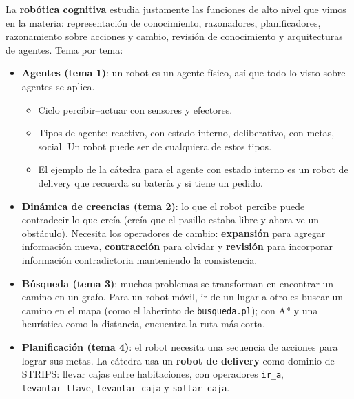 \documentclass[11pt,a4paper]{article}
\begin{document}
La \textbf{robótica cognitiva} estudia justamente las funciones de alto nivel que vimos en la materia: representación de conocimiento, razonadores, planificadores, razonamiento sobre acciones y cambio, revisión de conocimiento y arquitecturas de agentes. Tema por tema:
\begin{itemize}
  \item \textbf{Agentes (tema 1)}: un robot es un agente físico, así que todo lo visto sobre agentes se aplica.
  \begin{itemize}
    \item Ciclo percibir--actuar con sensores y efectores.
    \item Tipos de agente: reactivo, con estado interno, deliberativo, con metas, social. Un robot puede ser de cualquiera de estos tipos.
    \item El ejemplo de la cátedra para el agente con estado interno es un robot de delivery que recuerda su batería y si tiene un pedido.
  \end{itemize}
  \item \textbf{Dinámica de creencias (tema 2)}: lo que el robot percibe puede contradecir lo que creía (creía que el pasillo estaba libre y ahora ve un obstáculo). Necesita los operadores de cambio: \textbf{expansión} para agregar información nueva, \textbf{contracción} para olvidar y \textbf{revisión} para incorporar información contradictoria manteniendo la consistencia.
  \item \textbf{Búsqueda (tema 3)}: muchos problemas se transforman en encontrar un camino en un grafo. Para un robot móvil, ir de un lugar a otro es buscar un camino en el mapa (como el laberinto de \texttt{busqueda.pl}); con A* y una heurística como la distancia, encuentra la ruta más corta.
  \item \textbf{Planificación (tema 4)}: el robot necesita una secuencia de acciones para lograr sus metas. La cátedra usa un \textbf{robot de delivery} como dominio de STRIPS: llevar cajas entre habitaciones, con operadores \texttt{ir\_a}, \texttt{levantar\_llave}, \texttt{levantar\_caja} y \texttt{soltar\_caja}.
\end{itemize}
\end{document}
